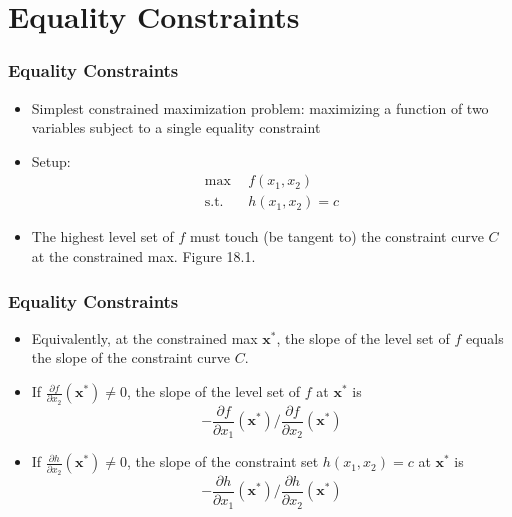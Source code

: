 \documentclass[9pt,aspectratio=169]{beamer}
\begin{document}
\section{Equality Constraints}

\begin{frame}
	\frametitle{Equality Constraints}
\begin{itemize}
	\item Simplest constrained maximization problem: maximizing a function of two variables subject to a single equality constraint
	\item Setup: 
	\begin{align}
	\text{max}\ \ & f(x_1,x_2) \nonumber \\
	\text{s.t.}\ \ & h(x_1,x_2) = c \nonumber 
	\end{align}
	\item The highest level set of $f$ must touch (be tangent to) the
    constraint curve $C$ at the constrained max. Figure 18.1.
\end{itemize}
\end{frame}

\begin{frame}
	\frametitle{Equality Constraints}
	\begin{itemize}
		\item Equivalently, at the constrained max $\mathbf{x^*}$, the slope
        of the level set of $f$ equals the slope of the constraint curve $C$. 
		\item If $\frac{\partial f}{\partial x_2}(\mathbf{x^*})\neq0$, the
        slope of the level set of $f$ at $\mathbf{x^*}$ is
        $$-\frac{\partial f}{\partial x_1}(\mathbf{x^*})\Big/\frac{\partial f}{\partial x_2}(\mathbf{x^*})$$
		\item If $\frac{\partial h}{\partial x_2}(\mathbf{x^*})\neq0$, the
        slope of the constraint set $h(x_1,x_2) = c$ at $\mathbf{x^*}$ is
		$$-\frac{\partial h}{\partial x_1}(\mathbf{x^*})\Big/\frac{\partial h}{\partial x_2}(\mathbf{x^*})$$
	\end{itemize}
\end{frame}
\end{document}
